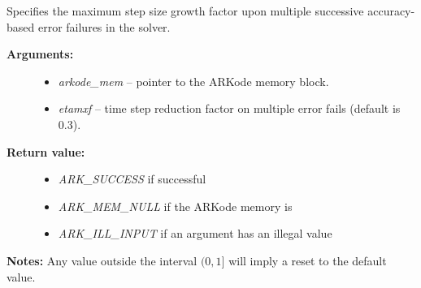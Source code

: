 \documentclass[letterpaper,10pt,english]{sphinxmanual}
\begin{document}
\begin{fulllineitems}
\label{c_interface/User_callable:c.ARKodeSetMaxEFailGrowth}
Specifies the maximum step size growth factor upon multiple successive
accuracy-based error failures in the solver.
\begin{description}
\item[{\textbf{Arguments:}}] \leavevmode\begin{itemize}
\item {} 
\emph{arkode\_mem} -- pointer to the ARKode memory block.

\item {} 
\emph{etamxf} -- time step reduction factor on multiple error fails (default is 0.3).

\end{itemize}

\item[{\textbf{Return value:}}] \leavevmode\begin{itemize}
\item {} 
\emph{ARK\_SUCCESS} if successful

\item {} 
\emph{ARK\_MEM\_NULL} if the ARKode memory is 

\item {} 
\emph{ARK\_ILL\_INPUT} if an argument has an illegal value

\end{itemize}

\end{description}

\textbf{Notes:} Any value outside the interval \((0,1]\) will imply a reset to the default value.

\end{fulllineitems}

\end{document}
